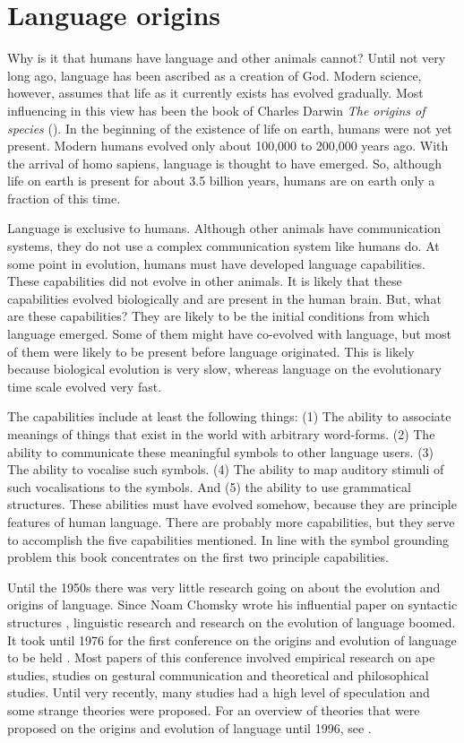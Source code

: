 \section{Language origins}\label{s:intro:origins}

Why is it that humans have language and other animals cannot? Until not very long ago, language has been ascribed as a creation of God. Modern science, however, assumes that life as it currently exists has evolved gradually. Most influencing in this view has been the book of Charles Darwin {\em The origins of species} (\citeyear{darwin:1968}). In the beginning of the existence of life on earth, humans were not yet present. Modern humans evolved only about 100,000 to 200,000 years ago. With the arrival of homo sapiens, language is thought to have emerged. So, although life on earth is present for about 3.5 billion years, humans are on earth only a fraction of this time.

Language is exclusive to humans. Although other animals have communication systems, they do not use a complex communication system like humans do. At some point in evolution, humans must have developed language capabilities. These capabilities did not evolve in other animals. It is likely that these capabilities evolved biologically and are present in the human brain. But, what are these capabilities? They are likely to be the initial conditions from which language emerged. Some of them might have co-evolved with language, but most of them were likely to be present before language originated. This is likely because biological evolution is very slow, whereas language on the evolutionary time scale evolved very fast.

The capabilities include at least the following things: (1) The ability to associate meanings of things that exist in the world with arbitrary word-forms. (2) The ability to communicate these meaningful symbols to other language users. (3) The ability to vocalise such symbols. (4) The ability to map auditory stimuli of such vocalisations to the symbols. And (5) the ability to use grammatical structures. These abilities must have evolved somehow, because they are principle features of human language. There are probably more capabilities, but they serve to accomplish the five capabilities mentioned. In line with the symbol grounding problem this book concentrates on the first two principle capabilities.

Until the 1950s there was very little research going on about the evolution and origins of language. Since Noam Chomsky wrote his influential paper on syntactic structures \citep{chomsky:1956}, linguistic research and research on the evolution of language boomed. It took until 1976 for the first conference on the origins and evolution of language to be held \citep{harnad:1976}. Most papers of this conference involved empirical research on ape studies, studies on gestural communication and theoretical and philosophical studies. Until very recently, many studies had a high level of speculation and some strange theories were proposed. For an overview of theories that were proposed on the origins and evolution of language until 1996, see \citet{aitchison:1996}.

